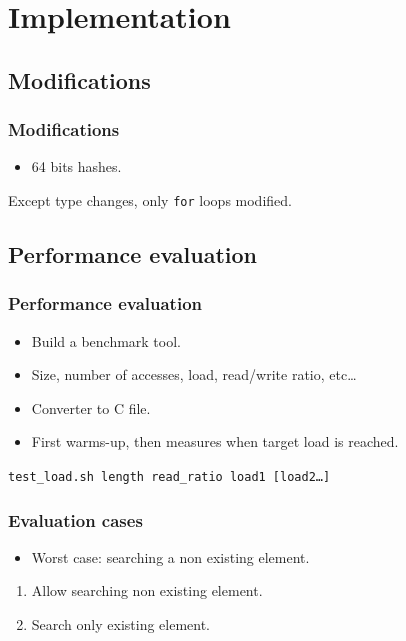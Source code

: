 \documentclass{beamer}
\begin{document}
\section{Implementation}
\subsection{Modifications}
\begin{frame}
	\frametitle{Modifications}

	\begin{itemize}
		\item 64 bits hashes.
	\end{itemize}
	\begin{center}
	\end{center}
	
	Except type changes, only \texttt{for} loops modified.

\end{frame}
\subsection{Performance evaluation}
\begin{frame}
	\frametitle{Performance evaluation}
	\begin{itemize}
		\item Build a benchmark tool.
		\item Size, number of accesses, load, read/write ratio, etc\ldots
		\item Converter to C file.
		\item First warms-up, then measures when target load is reached.
	\end{itemize}
	
	\vspace{0.5cm}
	\begin{center}
		\texttt{test\_load.sh length read\_ratio load1 [load2\ldots]}
	\end{center}

\end{frame}

\begin{frame}
	\frametitle{Evaluation cases}
	\begin{itemize}
		\item Worst case: searching a non existing element.
	\end{itemize}

	\begin{enumerate}
		\item Allow searching non existing element.
		\item Search only existing element.
	\end{enumerate}
\end{frame}
\end{document}
